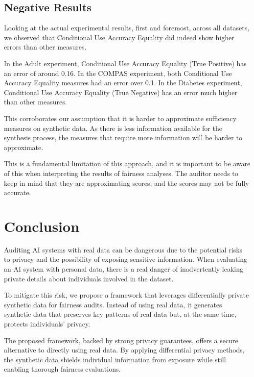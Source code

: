 \documentclass[manuscript,screen,review,anonymous]{acmart}
\begin{document}
\subsection{Negative Results}

Looking at the actual experimental results, first and foremost, across all datasets, we observed that Conditional Use Accuracy Equality did indeed show higher errors than other measures.

In the Adult experiment, Conditional Use Accuracy Equality (True Positive) has an error of around 0.16. In the COMPAS experiment, both Conditional Use Accuracy Equality measures had an error over 0.1. In the Diabetes experiment, Conditional Use Accuracy Equality (True Negative) has an error much higher than other measures.

This corroborates our assumption that it is harder to approximate sufficiency measures on synthetic data. As there is less information available for the synthesis process, the measures that require more information will be harder to approximate.


This is a fundamental limitation of this approach, and it is important to be aware of this when interpreting the results of fairness analyses. The auditor needs to keep in mind that they are approximating scores, and the scores may not be fully accurate.

\section{Conclusion}

Auditing AI systems with real data can be dangerous due to the potential risks to privacy and the possibility of exposing sensitive information. When evaluating an AI system with personal data, there is a real danger of inadvertently leaking private details about individuals involved in the dataset.

To mitigate this risk, we propose a framework that leverages differentially private synthetic data for fairness audits. Instead of using real data, it generates synthetic data that preserves key patterns of real data but, at the same time, protects individuals' privacy.

The proposed framework, backed by strong privacy guarantees, offers a secure alternative to directly using real data. By applying differential privacy methods, the synthetic data shields individual information from exposure while still enabling thorough fairness evaluations.
\end{document}
